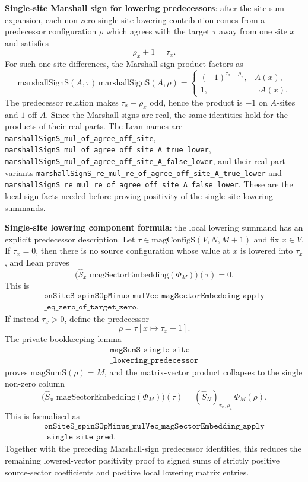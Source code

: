 \documentclass[a4paper,11pt]{article}
\begin{document}
\textbf{Single-site Marshall sign for lowering predecessors}: after the
site-sum expansion, each non-zero single-site lowering contribution
comes from a predecessor configuration \(\rho\) which agrees with the
target \(\tau\) away from one site \(x\) and satisfies
\[
  \rho_x + 1 = \tau_x .
\]
For such one-site differences, the Marshall-sign product factors as
\[
  \mathrm{marshallSignS}(A,\tau)\,
  \mathrm{marshallSignS}(A,\rho)
  =
  \begin{cases}
    (-1)^{\tau_x+\rho_x}, & A(x),\\
    1, & \neg A(x).
  \end{cases}
\]
The predecessor relation makes \(\tau_x+\rho_x\) odd, hence the product
is \(-1\) on \(A\)-sites and \(1\) off \(A\).  Since the Marshall signs
are real, the same identities hold for the products of their real
parts.  The Lean names are
\texttt{marshallSignS\_mul\_of\_agree\_off\_site},
\texttt{marshallSignS\_mul\_of\_agree\_off\_site\_A\_true\_lower},
\texttt{marshallSignS\_mul\_of\_agree\_off\_site\_A\_false\_lower}, and
their real-part variants
\texttt{marshallSignS\_re\_mul\_re\_of\_agree\_off\_site\_A\_true\_lower}
and
\texttt{marshallSignS\_re\_mul\_re\_of\_agree\_off\_site\_A\_false\_lower}.
These are the local sign facts needed before proving positivity of the
single-site lowering summands.

\textbf{Single-site lowering component formula}: the local lowering
summand has an explicit predecessor description.  Let
\(\tau\in\mathrm{magConfigS}(V,N,M+1)\) and fix \(x\in V\).  If
\(\tau_x=0\), then there is no source configuration whose value at
\(x\) is lowered into \(\tau_x\), and Lean proves
\[
  \bigl(\hat S^-_x\,\mathrm{magSectorEmbedding}(\Phi_M)\bigr)(\tau)=0.
\]
This is
\[
\begin{gathered}
\texttt{onSiteS\_spinSOpMinus\_mulVec\_magSectorEmbedding\_apply}\\
\texttt{\_eq\_zero\_of\_target\_zero}.
\end{gathered}
\]
If instead \(\tau_x>0\), define the predecessor
\[
  \rho = \tau[x \mapsto \tau_x-1].
\]
The private bookkeeping lemma
\[
\begin{gathered}
\texttt{magSumS\_single\_site}\\
\texttt{\_lowering\_predecessor}
\end{gathered}
\]
proves
\(\mathrm{magSumS}(\rho)=M\), and the matrix-vector product collapses to
the single non-zero column
\[
  \bigl(\hat S^-_x\,\mathrm{magSectorEmbedding}(\Phi_M)\bigr)(\tau)
  =
  (\hat S^-_N)_{\tau_x,\rho_x}\,\Phi_M(\rho).
\]
This is formalised as
\[
\begin{gathered}
\texttt{onSiteS\_spinSOpMinus\_mulVec\_magSectorEmbedding\_apply}\\
\texttt{\_single\_site\_pred}.
\end{gathered}
\]
Together with the preceding Marshall-sign predecessor identities, this
reduces the remaining lowered-vector positivity proof to signed sums of
strictly positive source-sector coefficients and positive local lowering
matrix entries.
\end{document}
